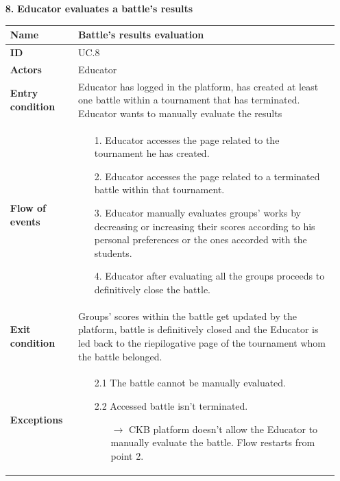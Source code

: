 \documentclass{article}
\begin{document}
{\begin{enumerate}
    \item[\textbf{8.}] \textbf{Educator evaluates a battle's results}
          \begin{xltabular}{\textwidth}
              {| >{\raggedright\arraybackslash}g | >{\raggedright\arraybackslash}X |}
              \hline
              \endfirsthead
              \hline
              \endhead
              \endfoot
              \hline
              \endlastfoot




              \textbf{Name} & Battle's results evaluation\\
              \hline
              \textbf{ID} & UC.8\\
              \hline
              \textbf{Actors} & Educator\\
              \hline
              \textbf{Entry condition} & Educator has logged in the platform, has created at least one battle
              within a tournament that has terminated. Educator wants to manually evaluate the results\\
              \hline
              \textbf{Flow of events} &    \begin{enumerate}
                  \item[1.] Educator accesses the page related to the tournament
                        he has created.
                  \item[2.] Educator accesses the page related to a terminated
                        battle within that tournament.
                  \item[3.] Educator manually evaluates groups' works by decreasing or
                        increasing their scores according to his personal preferences or
                        the ones accorded with the students.
                  \item[4.] Educator after evaluating all the groups proceeds to
                        definitively close the battle.
              \end{enumerate} \\
              \hline
              \textbf{Exit condition} & Groups' scores within the battle get updated by the platform,
              battle is definitively closed and the Educator is led back to the riepilogative page of
              the tournament whom the battle belonged.\\
              \hline
              \textbf{Exceptions} &    \begin{itemize}
                  \item[2.1] The battle cannot be manually evaluated.
                  \item[2.2] Accessed battle isn't terminated.
                        \begin{itemize}
                            \item[$\rightarrow$] CKB platform doesn't allow the Educator to manually evaluate
                                  the battle. Flow restarts from point 2.
                        \end{itemize}
              \end{itemize}
          \end{xltabular}


\end{enumerate}}
\end{document}
